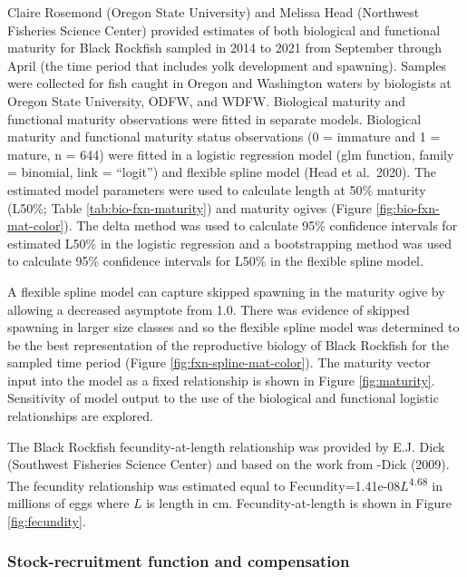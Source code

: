 \documentclass[11pt,
  english,
  letterpaper,
]{article}
\begin{document}
Claire Rosemond (Oregon State University) and Melissa Head (Northwest Fisheries Science Center) provided estimates of both biological and functional maturity for Black Rockfish sampled in 2014 to 2021 from September through April (the time period that includes yolk development and spawning). Samples were collected for fish caught in Oregon and Washington waters by biologists at Oregon State University, ODFW, and WDFW. Biological maturity and functional maturity observations were fitted in separate models. Biological maturity and functional maturity status observations (0 = immature and 1 = mature, n = 644) were fitted in a logistic regression model (glm function, family = binomial, link = ``logit'') and flexible spline model (Head et al.~2020). The estimated model parameters were used to calculate length at 50\% maturity (L50\%; Table \ref{tab:bio-fxn-maturity}) and maturity ogives (Figure \ref{fig:bio-fxn-mat-color}). The delta method was used to calculate 95\% confidence intervals for estimated L50\% in the logistic regression and a bootstrapping method was used to calculate 95\% confidence intervals for L50\% in the flexible spline model.

A flexible spline model can capture skipped spawning in the maturity ogive by allowing a decreased asymptote from 1.0. There was evidence of skipped spawning in larger size classes and so the flexible spline model was determined to be the best representation of the reproductive biology of Black Rockfish for the sampled time period (Figure \ref{fig:fxn-spline-mat-color}). The maturity vector input into the model as a fixed relationship is shown in Figure \ref{fig:maturity}. Sensitivity of model output to the use of the biological and functional logistic relationships are explored.

The Black Rockfish fecundity-at-length relationship was provided by E.J. Dick (Southwest Fisheries Science Center) and based on the work from -Dick (2009). The fecundity relationship was estimated equal to \(\text{Fecundity}\)=1.41e-08\(L\)\textsuperscript{4.68} in millions of eggs where \(L\) is length in cm. Fecundity-at-length is shown in Figure \ref{fig:fecundity}.

\hypertarget{stock-recruitment-function-and-compensation}{%
\subsubsection{Stock-recruitment function and compensation}\label{stock-recruitment-function-and-compensation}}
\end{document}

